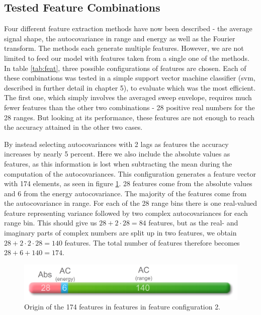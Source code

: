 \subsection{Tested Feature Combinations}

Four different feature extraction methods have now been described - the average signal shape, the autocovariance in range and energy as well as the Fourier transform. The methods each generate multiple features. However, we are not limited to feed our model with features taken from a single one of the methods. In table \ref{tab:feat}, three possible configurations of features are chosen. Each of these combinations was tested in a simple support vector machine classifier (\gls{svm}, described in further detail in chapter 5), to evaluate which was the most efficient. The first one, which simply involves the averaged sweep envelope, requires much fewer features than the other two combinations - 28 positive real numbers for the 28 ranges. But looking at its performance, these features are not enough to reach the accuracy attained in the other two cases. 

By instead selecting autocovariances with 2 lags as features the accuracy increases by nearly 5 percent. Here we also include the absolute values as features, as this information is lost when subtracting the mean during the computation of the autocovariances. This configuration generates a feature vector with 174 elements, as seen in figure \ref{fig:feat_fig}. 28 features come from the absolute values and 6 from the energy autocovariance. The majority of the features come from the autocovariance in range. For each of the 28 range bins there is one real-valued feature representing variance followed by two complex autocovariances for each range bin. This should give us $28+2\cdot 28=84$ features, but as the real- and imaginary parts of complex numbers are split up in two features, we obtain $28+2\cdot2\cdot 28=140$ features. The total number of features therefore becomes $28+6+140=174$.

\begin{figure}[h]
	\centering
	\includegraphics[scale=0.8]{figs_temp/features.jpg}
	\caption{Origin of the 174 features in features in feature configuration 2.}
	\label{fig:feat_fig}
\end{figure}

